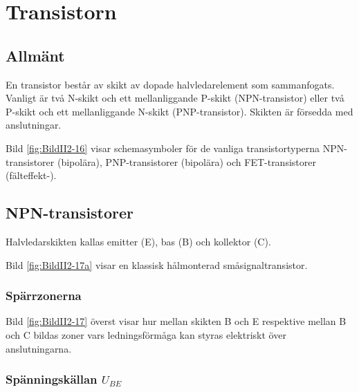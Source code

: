 \section{Transistorn}
\label{transistorn}

\subsection{Allmänt}


En transistor består av skikt av dopade halvledarelement som sammanfogats.
Vanligt är två N-skikt och ett mellanliggande P-skikt (NPN-transistor) eller två P-skikt och ett mellanliggande N-skikt (PNP-transistor).
Skikten är försedda med anslutningar.

Bild \ref{fig:BildII2-16} visar schemasymboler för de vanliga tran\-sistor\-typerna 
NPN-transistorer (bipolära), PNP-\-tran\-sistorer (bipolära) och
FET-transistorer (fälteffekt-).

\subsection{NPN-transistorer}

Halvledarskikten kallas emitter (E), bas (B) och kollektor (C).


Bild \ref{fig:BildII2-17a} visar en klassisk hålmonterad småsignaltransistor.

\subsubsection{Spärrzonerna}


Bild \ref{fig:BildII2-17} överst visar hur mellan skikten B och E respektive mellan B och C bildas zoner vars ledningsförmåga kan styras elektriskt över anslutningarna.

\subsubsection{Spänningskällan \(U_{BE}\)}

